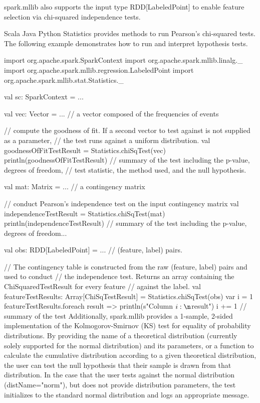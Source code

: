 spark.mllib also supports the input type RDD[LabeledPoint] to enable feature selection via chi-squared independence tests.

Scala
Java
Python
Statistics provides methods to run Pearson’s chi-squared tests. The following example demonstrates how to run and interpret hypothesis tests.

import org.apache.spark.SparkContext
import org.apache.spark.mllib.linalg._
import org.apache.spark.mllib.regression.LabeledPoint
import org.apache.spark.mllib.stat.Statistics._

val sc: SparkContext = ...

val vec: Vector = ... // a vector composed of the frequencies of events

// compute the goodness of fit. If a second vector to test against is not supplied as a parameter, 
// the test runs against a uniform distribution.  
val goodnessOfFitTestResult = Statistics.chiSqTest(vec)
println(goodnessOfFitTestResult) // summary of the test including the p-value, degrees of freedom, 
                                 // test statistic, the method used, and the null hypothesis.

val mat: Matrix = ... // a contingency matrix

// conduct Pearson's independence test on the input contingency matrix
val independenceTestResult = Statistics.chiSqTest(mat) 
println(independenceTestResult) // summary of the test including the p-value, degrees of freedom...

val obs: RDD[LabeledPoint] = ... // (feature, label) pairs.

// The contingency table is constructed from the raw (feature, label) pairs and used to conduct
// the independence test. Returns an array containing the ChiSquaredTestResult for every feature 
// against the label.
val featureTestResults: Array[ChiSqTestResult] = Statistics.chiSqTest(obs)
var i = 1
featureTestResults.foreach { result =>
    println(s"Column $i:\n$result")
    i += 1
} // summary of the test
Additionally, spark.mllib provides a 1-sample, 2-sided implementation of the Kolmogorov-Smirnov (KS) test for equality of probability distributions. By providing the name of a theoretical distribution (currently solely supported for the normal distribution) and its parameters, or a function to calculate the cumulative distribution according to a given theoretical distribution, the user can test the null hypothesis that their sample is drawn from that distribution. In the case that the user tests against the normal distribution (distName="norm"), but does not provide distribution parameters, the test initializes to the standard normal distribution and logs an appropriate message.

